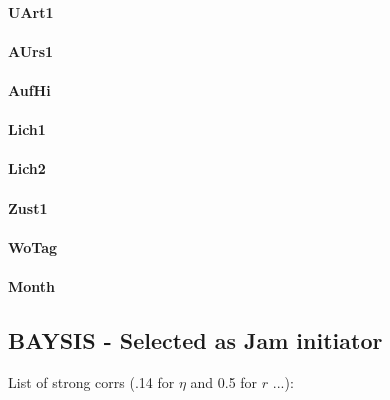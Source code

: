 \documentclass[a4paper,headsepline,footsepline,fontsize=11pt,BCOR=12mm,DIV=12]{report}
\begin{document}
\paragraph{UArt1}

\paragraph{AUrs1}

\paragraph{AufHi}

\paragraph{Lich1}

\paragraph{Lich2}

\paragraph{Zust1}

\paragraph{WoTag}

\paragraph{Month}

\subsection{BAYSIS - Selected as Jam initiator}

List of strong corrs (.14 for $\eta$ and 0.5 for $r$ ...):
\end{document}
